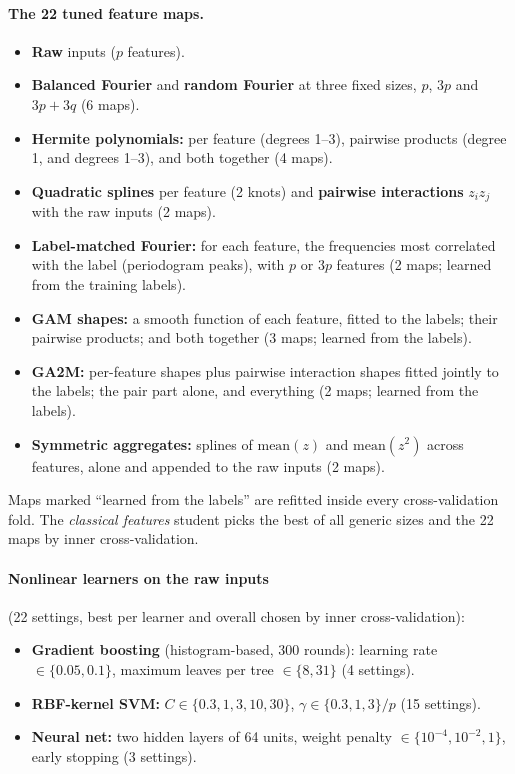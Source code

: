 \documentclass[11pt]{article}
\begin{document}
\paragraph{The 22 tuned feature maps.}
\begin{itemize}\setlength{\itemsep}{1pt}
\item \textbf{Raw} inputs ($p$ features).
\item \textbf{Balanced Fourier} and \textbf{random Fourier} at three fixed sizes, $p$, $3p$ and $3p+3q$
(6 maps).
\item \textbf{Hermite polynomials:} per feature (degrees 1--3), pairwise products (degree 1, and degrees
1--3), and both together (4 maps).
\item \textbf{Quadratic splines} per feature (2 knots) and \textbf{pairwise interactions} $z_iz_j$ with the raw
inputs (2 maps).
\item \textbf{Label-matched Fourier:} for each feature, the frequencies most correlated with the label
(periodogram peaks), with $p$ or $3p$ features (2 maps; learned from the training labels).
\item \textbf{GAM shapes:} a smooth function of each feature, fitted to the labels; their pairwise products;
and both together (3 maps; learned from the labels).
\item \textbf{GA2M:} per-feature shapes plus pairwise interaction shapes fitted jointly to the labels; the pair
part alone, and everything (2 maps; learned from the labels).
\item \textbf{Symmetric aggregates:} splines of $\mathrm{mean}(z)$ and $\mathrm{mean}(z^2)$ across features,
alone and appended to the raw inputs (2 maps).
\end{itemize}
Maps marked ``learned from the labels'' are refitted inside every cross-validation fold. The
\emph{classical features} student picks the best of all generic sizes and the 22 maps by inner
cross-validation.

\paragraph{Nonlinear learners on the raw inputs} (22 settings, best per learner and overall chosen by inner
cross-validation):
\begin{itemize}\setlength{\itemsep}{1pt}
\item \textbf{Gradient boosting} (histogram-based, 300 rounds): learning rate $\in\{0.05,0.1\}$, maximum
leaves per tree $\in\{8,31\}$ (4 settings).
\item \textbf{RBF-kernel SVM:} $C\in\{0.3,1,3,10,30\}$, $\gamma\in\{0.3,1,3\}/p$ (15 settings).
\item \textbf{Neural net:} two hidden layers of 64 units, weight penalty $\in\{10^{-4},10^{-2},1\}$, early
stopping (3 settings).
\end{itemize}
\end{document}
